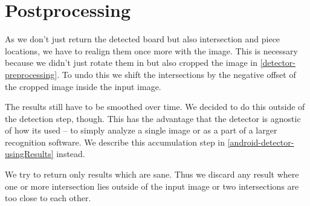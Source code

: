 	\section{Postprocessing}
	As we don't just return the detected board but also intersection and piece locations, we have to realign them once more with the image. This is necessary because we didn't just rotate them in but also cropped the image in \autoref{detector-preprocessing}. To undo this we shift the intersections by the negative offset of the cropped image inside the input image.

	The results still have to be smoothed over time. We decided to do this outside of the detection step, though. This has the advantage that the detector is agnostic of how its used -- to simply analyze a single image or as a part of a larger recognition software. We describe this accumulation step in	\autoref{android-detector-usingResults} instead.

	We try to return only results which are sane. Thus we discard any result where one or more intersection lies outside of the input image or two intersections are too close to each other.
